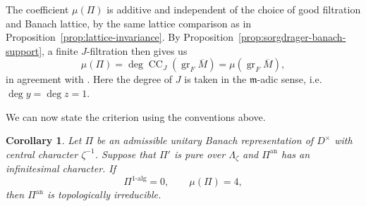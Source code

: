 \documentclass[11pt]{article}
\newtheorem{corollary}[theorem]{Corollary}
\theoremstyle{definition}
\newcommand{\gr}{\operatorname{gr}}
\newcommand{\CC}{\operatorname{CC}}
\begin{document}
The coefficient $\mu(\Pi)$ is additive and independent of the choice
of good filtration and Banach lattice, by the same lattice
comparison as in Proposition~\ref{prop:lattice-invariance}.
By Proposition~\ref{prop:sorgdrager-banach-support},
a finite $J$-filtration then gives us
\[
 \mu(\Pi)=\deg\CC_J(\gr_F\overline M)=\mu(\gr_F\overline M),
\]
in agreement with \cite[\S3.2 and Lemma~3.11]{HuWangPadic}. Here the degree
of $J$ is taken in the $\mathfrak{m}$-adic sense, i.e. $\deg y=\deg z=1$.

We can now state the criterion using the conventions above.

\begin{corollary}\label{cor:banach-four-analytic-irreducible}
Let $\Pi$ be an admissible unitary Banach representation of
$D^\times$ with central character $\zeta^{-1}$.
Suppose that $\Pi'$ is pure over $\Lambda_\zeta$ and
$\Pi^{\mathrm{an}}$ has an infinitesimal character. If
\[
 \Pi^{1\text{-}\mathrm{alg}}=0,\qquad \mu(\Pi)=4,
\]
then $\Pi^{\mathrm{an}}$ is topologically irreducible.
\end{corollary}
\end{document}
